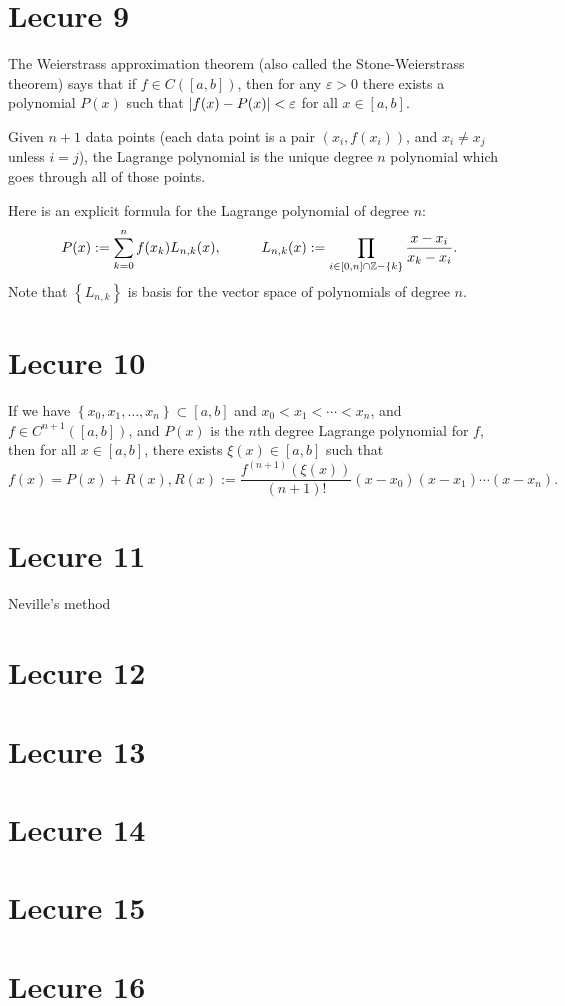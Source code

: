 \documentclass{article}
\begin{document}
\section{Lecure 9}
The Weierstrass approximation theorem (also called the Stone-Weierstrass theorem) says that if $f \in C([a,b])$, then for any $\varepsilon > 0$ there exists a polynomial $P(x)$ such that $\left\lvert f(x)-P(x) \right\rvert < \varepsilon$ for all $x \in [a,b]$.
\par
Given $n+1$ data points (each data point is a pair $(x_i, f(x_i))$, and $x_i \neq x_j$ unless $i=j$), the Lagrange polynomial is the unique degree $n$ polynomial which goes through all of those points.
\par
Here is an explicit formula for the Lagrange polynomial of degree $n$:
\[ P(x) := \sum_{k=0}^n f(x_k)L_{n,k}(x), \hspace{1cm} L_{n,k}(x) := \prod_{i \in [0,n]\cap \mathbb{Z} - \{k\}} \frac{x-x_i}{x_k-x_i}. \]
Note that $ \left\{ L_{n,k} \right\}$ is basis for the vector space of polynomials of degree $n$.

\section{Lecure 10}
If we have $ \left\{ x_0, x_1, \dots, x_n \right\} \subset [a,b]$ and $x_0 < x_1 < \cdots < x_n$, and $f \in C^{n+1}([a,b])$, and $P(x)$ is the $n$th degree Lagrange polynomial for $f$, then for all $x \in [a,b]$, there exists $\xi(x) \in [a,b]$ such that
\[ f(x) = P(x) + R(x), R(x) := \frac{f^{(n+1)}(\xi(x))}{(n+1)!}(x-x_0)(x-x_1)\cdots (x-x_n). \]

\section{Lecure 11}
Neville's method

\section{Lecure 12}

\section{Lecure 13}

\section{Lecure 14}

\section{Lecure 15}

\section{Lecure 16}
\end{document}
